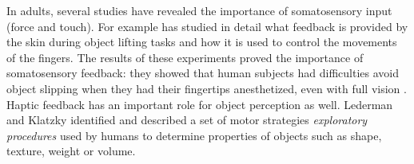 In adults, several studies have revealed the importance of
somatosensory input (force and touch). For example
\cite{Johansson90Liffiing} has studied in detail what feedback
is provided by the skin during object lifting tasks and how it is
used to control the movements of the fingers. The results of these
experiments proved the importance of somatosensory feedback: they 
showed that human subjects had difficulties avoid object slipping when 
they had their fingertips anesthetized, even with full vision
\cite{johansson91how}. Haptic feedback has an important role for
object perception as well. Lederman and Klatzky \cite{klatzky87Hand}
identified and described a set of motor strategies 
\emph{exploratory procedures} used by humans to determine properties 
of objects such as shape, texture, weight or volume.








